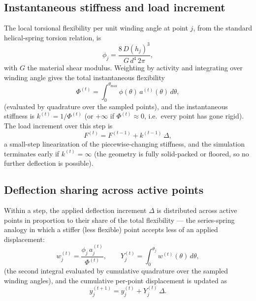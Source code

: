 \documentclass[11pt]{article}
\begin{document}
\subsection{Instantaneous stiffness and load increment}

The local torsional flexibility per unit winding angle at point $j$,
from the standard helical-spring torsion relation, is
\begin{equation}
\phi_j = \frac{8\,D(h_j)^3}{G\,d^{4}\,2\pi},
\label{eq:local-flexibility}
\end{equation}
with $G$ the material shear modulus. Weighting by activity and
integrating over winding angle gives the total instantaneous flexibility
\begin{equation}
\Phi^{(t)} = \int_{0}^{\theta_{\max}} \phi(\theta)\,a^{(t)}(\theta)\,d\theta ,
\label{eq:total-flexibility}
\end{equation}
(evaluated by quadrature over the sampled points), and the instantaneous
stiffness is $k^{(t)} = 1/\Phi^{(t)}$ (or $+\infty$ if
$\Phi^{(t)}\approx 0$, i.e.\ every point has gone rigid). The load
increment over this step is
\begin{equation}
F^{(t)} = F^{(t-1)} + k^{(t-1)}\,\Delta ,
\label{eq:load-increment}
\end{equation}
a small-step linearization of the piecewise-changing stiffness, and the
simulation terminates early if $k^{(t)}=\infty$ (the geometry is fully
solid-packed or floored, so no further deflection is possible).

\subsection{Deflection sharing across active points}

Within a step, the applied deflection increment $\Delta$ is distributed
across active points in proportion to their share of the total
flexibility — the series-spring analogy in which a stiffer (less
flexible) point accepts less of an applied displacement:
\begin{equation}
w_j^{(t)} = \frac{\phi_j\,a_j^{(t)}}{\Phi^{(t)}},
\qquad
Y_j^{(t)} = \int_0^{\theta_j} w^{(t)}(\theta)\,d\theta,
\label{eq:deformation-share}
\end{equation}
(the second integral evaluated by cumulative quadrature over the sampled
winding angles), and the cumulative per-point displacement is updated as
\begin{equation}
y_j^{(t+1)} = y_j^{(t)} + Y_j^{(t)}\,\Delta .
\label{eq:cumulative-update}
\end{equation}
\end{document}
